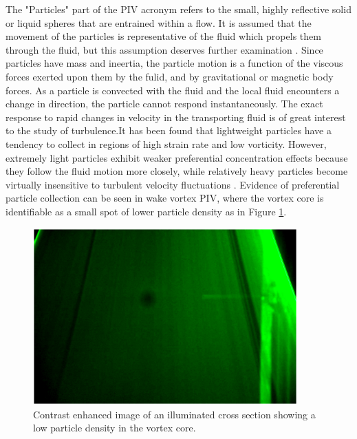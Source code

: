 The "Particles" part of the PIV acronym refers to the small, highly reflective 
solid or liquid spheres that are entrained within a flow. It is assumed that 
the movement of the particles is representative of the fluid which propels them 
through the fluid, but this assumption deserves further examination 
\cite{roscoe1952}. Since particles have mass and ineertia, the particle motion 
is a function of the viscous forces exerted upon them by the fulid, and by 
gravitational or magnetic body forces. As a particle is convected with the 
fluid and the local fluid encounters a change in direction, the particle cannot 
respond instantaneously. The exact response to rapid changes in velocity in the 
transporting fluid is of great interest to the study of turbulence.It has been 
found that lightweight 
particles have a tendency to collect in regions of high strain rate and low 
vorticity. However, extremely light particles exhibit weaker preferential 
concentration effects because they follow the fluid motion more closely, while 
relatively heavy particles become virtually insensitive to turbulent velocity 
fluctuations \cite{squires1990}. Evidence of preferential particle collection 
can be seen in wake vortex PIV, where the vortex core is identifiable as a 
small spot of lower particle density as in Figure 
\ref{fig:vortex_core_particles}.
	
\begin{figure}
	\centering
	\includegraphics[width=4in]{figs/piv_method/vortex_core}
	\caption{Contrast enhanced image of an illuminated cross section showing a 
	low particle density in the vortex core.}
	\label{fig:vortex_core_particles}
\end{figure}

